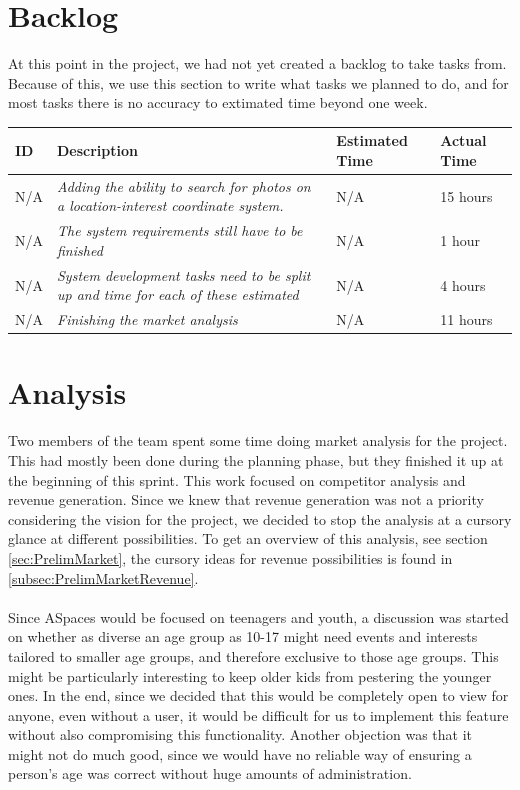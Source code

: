 \section{Backlog}
\label{sec:S1Backlog}
At this point in the project, we had not yet created a backlog to take tasks from. Because of this, we use this section to write what tasks we planned to do, and for most tasks there is no accuracy to extimated time beyond one week. \\
\begin{minipage}{\linewidth}
\setlength{\tabcolsep}{12pt}
\centering
{}
\begin{tabular}{|p{1cm}|p{4cm}|p{2cm}|p{2cm}|}
\hline
\cellcolor{gray!25} ID & \cellcolor{gray!25} Description & \cellcolor{gray!25} Estimated Time & \cellcolor{gray!25} Actual Time \\
\hline
N/A & \it{Adding the ability to search for photos on a location-interest coordinate system.} & N/A & 15 hours \\
N/A & \it{The system requirements still have to be finished} & N/A & 1 hour \\
N/A & \it{System development tasks need to be split up and time for each of these estimated} & N/A & 4 hours \\
N/A & \it{Finishing the market analysis} & N/A & 11 hours \\
\hline
\end{tabular}
\end{minipage}

\section{Analysis}
\label{sec:S1Analysis}
Two members of the team spent some time doing market analysis for the project. This had mostly been done during the planning phase, but they finished it up at the beginning of this sprint. This work focused on competitor analysis and revenue generation. Since we knew that revenue generation was not a priority considering the vision for the project, we decided to stop the analysis at a cursory glance at different possibilities. To get an overview of this analysis, see section \ref{sec:PrelimMarket}, the cursory ideas for revenue possibilities is found in \ref{subsec:PrelimMarketRevenue}.

\paragraph{} Since ASpaces would be focused on teenagers and youth, a discussion was started on whether as diverse an age group as 10-17 might need events and interests tailored to smaller age groups, and therefore exclusive to those age groups. This might be particularly interesting to keep older kids from pestering the younger ones. In the end, since we decided that this would be completely open to view for anyone, even without a user, it would be difficult for us to implement this feature without also compromising this functionality. Another objection was that it might not do much good, since we would have no reliable way of ensuring a person's age was correct without huge amounts of administration.

